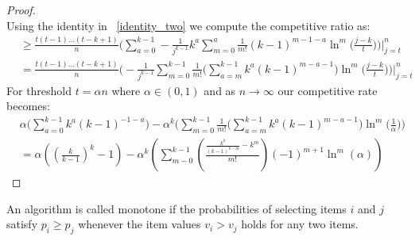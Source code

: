 \begin{proof}
\begin{equation}
\end{equation}
Using the identity in ~\eqref{identity_two} we compute the competitive ratio as:
\begin{align}
     & \geq\frac{t(t - 1)\dots (t - k + 1)}{n}
     \bigg(\sum_{a = 0}^{k - 1}- \frac{1}{j^{k - 1}}{ k ^ a }\sum_{m = 0}^{a}\frac{1}{m!}(k -1)^{m - 1 -a }\ln^m\Big(\frac{j - k}{t}\Big) \bigg) \Big|_{j = t}^{n}\\
     & =
     \frac{t(t - 1)\dots (t - k + 1)}{n}\bigg(- \frac{1}{j^{k - 1}}\sum_{m = 0}^{k - 1}\frac{1}{m!}\Big(\sum_{a = m}^{k - 1}{k ^ a}(k - 1)^{m - a - 1}\Big)\ln^m{\Big(\frac{j - k}{t}\Big)}\bigg)\Big|_{j = t}^{n}
\end{align}
For threshold $t = \alpha n $ where $\alpha \in (0,1)$ and as $n \xrightarrow{}\infty$ our competitive rate becomes:
\begin{align}
    & \alpha \bigg(\sum_{a = 0}^{k - 1}{ k ^ a }{(k - 1)}^{-1 - a}\Big) - \alpha^k\Big(\sum_{m=0}^{k - 1}\frac{1}{m!}\Big(\sum_{a = m}^{k - 1}{ k ^ a }(k - 1)^{m - a - 1}\Big)\ln^m\Big(\frac{1}{\alpha}\Big)\bigg)\\
    & = \alpha\left({\left(\frac{k}{k-1}\right)}^{k} - 1\right) - \alpha^k\left(\sum_{m-0}^{k-1}\left(\frac{\frac{k^k}{(k-1)^{k-m}} - k^m}{m!}\right)(-1)^{m+1}\ln^m(\alpha)\right)
\end{align}
\end{proof}
\begin{definition}
\label{monotone_defn}
An algorithm is called monotone if the probabilities of selecting items $i$ and $j$ satisfy $p_i \geq p_j$ whenever the item values $v_i > v_j$ holds for any two items.
\end{definition}

